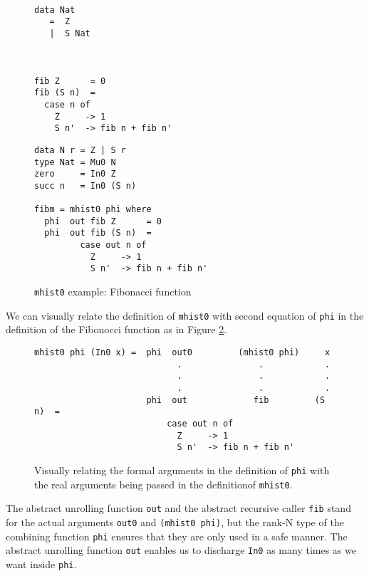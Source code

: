 \documentclass[letterpaper,12pt]{article}
\begin{document}
\begin{figure}
$\!\!\!\!\!\!\!\!\!$
\begin{minipage}{.49\linewidth}
\begin{verbatim}

data Nat
   =  Z
   |  S Nat



fib Z      = 0
fib (S n)  =
  case n of
    Z     -> 1
    S n'  -> fib n + fib n'
\end{verbatim}
\end{minipage}
\begin{minipage}{.49\linewidth}
\begin{verbatim}
data N r = Z | S r
type Nat = Mu0 N
zero     = In0 Z
succ n   = In0 (S n) 

fibm = mhist0 phi where
  phi  out fib Z      = 0
  phi  out fib (S n)  =
         case out n of
           Z     -> 1
           S n'  -> fib n + fib n'
\end{verbatim}
\end{minipage}
\caption{\texttt{mhist0} example: Fibonacci function}
\label{fig:fib}
\end{figure}

We can visually relate the definition of \verb|mhist0|
with second equation of \verb|phi| in the definition of
the Fibonocci function as in Figure \ref{fig:mhist0rel}.
\begin{figure}
\begin{verbatim}
mhist0 phi (In0 x) =  phi  out0         (mhist0 phi)     x
                            .               .            .
                            .               .            .
                            .               .            .
                      phi  out             fib         (S n)  =
                          case out n of
                            Z     -> 1
                            S n'  -> fib n + fib n'
\end{verbatim}
\caption{
Visually relating the formal arguments in the definition of \texttt{phi}
with the real arguments being passed in the definitionof \texttt{mhist0}.}
\label{fig:mhist0rel}
\end{figure}      
The abstract unrolling function \verb|out| and the abstract recursive caller \verb|fib|
stand for the actual arguments \verb|out0| and \verb|(mhist0 phi)|, but the rank-N type of
the combining function \verb|phi| ensures that they are only used in a safe manner.
The abstract unrolling function \verb|out| enables us to discharge \verb|In0|
as many times as we want inside \verb|phi|. 
\end{document}

